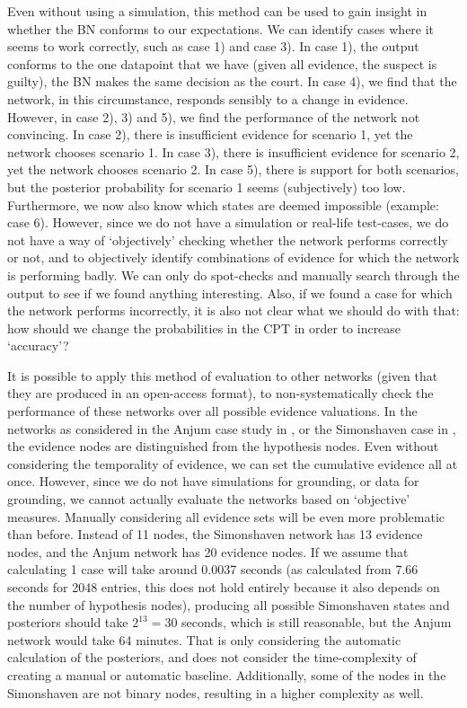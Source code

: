 \documentclass[12pt]{article}
\begin{document}
Even without using a simulation, this method can be used to gain insight in whether the BN conforms to our expectations. We can identify cases where it seems to work correctly, such as case 1) and case 3). In case 1), the output conforms to the one datapoint that we have (given all evidence, the suspect is guilty), the BN makes the same decision as the court. In case 4), we find that the network, in this circumstance, responds sensibly to a change in evidence. However, in case 2), 3) and 5), we find the performance of the network not convincing. In case 2), there is insufficient evidence for scenario 1, yet the network chooses scenario 1. In case 3), there is insufficient evidence for scenario 2, yet the network chooses scenario 2. In case 5), there is support for both scenarios, but the posterior probability for scenario 1 seems (subjectively) too low. Furthermore, we now also know which states are deemed impossible (example: case 6). However, since we do not have a simulation or real-life test-cases, we do not have a way of `objectively' checking whether the network performs correctly or not, and to objectively identify combinations of evidence for which the network is performing badly. We can only do spot-checks and manually search through the output to see if we found anything interesting. Also, if we found a case for which the network performs incorrectly, it is also not clear what we should do with that: how should we change the probabilities in the CPT in order to increase `accuracy'?

It is possible to apply this method of evaluation to other networks (given that they are produced in an open-access format), to non-systematically check the performance of these networks over all possible evidence valuations. In the networks as considered in the Anjum case study in \citet{vlek2016}, or the Simonshaven case in \citet{Fenton2019}, the evidence nodes are distinguished from the hypothesis nodes. Even without considering the temporality of evidence, we can set the cumulative evidence all at once. However, since we do not have simulations for grounding, or data for grounding, we cannot actually evaluate the networks based on `objective' measures. Manually considering all evidence sets will be even more problematic than before. Instead of 11 nodes, the Simonshaven network has 13 evidence nodes, and the Anjum network has 20 evidence nodes. If we assume that calculating 1 case will take around 0.0037 seconds (as calculated from 7.66 seconds for 2048 entries, this does not hold entirely because it also depends on the number of hypothesis nodes), producing all possible Simonshaven states and posteriors should take $2^{13} = 30$ seconds, which is still reasonable, but the Anjum network would take 64 minutes. That is only considering the automatic calculation of the posteriors, and does not consider the time-complexity of creating a manual or automatic baseline. Additionally, some of the nodes in the Simonshaven are not binary nodes, resulting in a higher complexity as well. 
\end{document}
